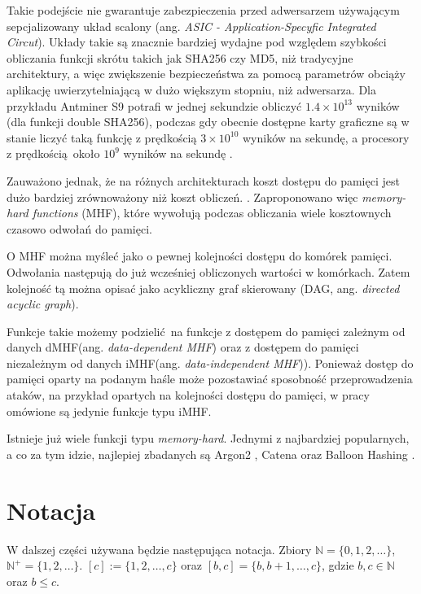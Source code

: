 Takie podejście nie gwarantuje zabezpieczenia przed adwersarzem używającym sepcjalizowany układ scalony (ang. \textit{ASIC - Application-Specyfic Integrated Circut}).
Układy takie są znacznie bardziej wydajne pod względem szybkości obliczania funkcji skrótu takich jak SHA256 czy MD5, niż tradycyjne architektury, a więc zwiększenie bezpieczeństwa za pomocą parametrów obciąży aplikację uwierzytelniającą w dużo większym stopniu, niż adwersarza.
Dla przykładu Antminer S9 \cite{antminer} potrafi w jednej sekundzie obliczyć $1.4\times 10^{13}$ wyników (dla funkcji double SHA256), podczas gdy obecnie dostępne karty graficzne są w stanie liczyć taką funkcję z prędkością $3\times 10^{10}$ wyników na sekundę, a procesory z prędkością około $10^9$ wyników na sekundę \cite{rs}.

Zauważono jednak, że na różnych architekturach koszt dostępu do pamięci jest dużo bardziej zrównoważony niż koszt obliczeń. \cite{percival2009stronger}.
Zaproponowano więc \textit{memory-hard functions} (MHF), które wywołują podczas obliczania wiele kosztownych czasowo odwołań do pamięci.

O MHF można myśleć jako o pewnej kolejności dostępu do komórek pamięci. Odwołania następują do już wcześniej obliczonych wartości w komórkach.
Zatem kolejność tą można opisać jako acykliczny graf skierowany (DAG, ang. \textit{directed acyclic graph}).

Funkcje takie możemy podzielić na funkcje z dostępem do pamięci zależnym od danych dMHF(ang. \textit{data-dependent MHF}) oraz z dostępem do pamięci niezależnym od danych iMHF(ang. \textit{data-independent MHF})). Ponieważ dostęp do pamięci oparty na podanym haśle może pozostawiać sposobność przeprowadzenia ataków, na przykład opartych na kolejności dostępu do pamięci, w pracy omówione są jedynie funkcje typu iMHF.

Istnieje już wiele funkcji typu \textit{memory-hard}. Jednymi z najbardziej popularnych, a co za tym idzie, najlepiej zbadanych są Argon2 \cite{biryukov2016argon2}, Catena \cite{forler2013catena} oraz Balloon Hashing \cite{boneh2016balloon}.

\section{Notacja}

W dalszej części używana będzie następująca notacja.
Zbiory $\mathbb{N} = \{ 0,1,2,\dots \}$, $ \mathbb{N}^{+} = \{ 1, 2, \dots \}$.
$[c] := \{1, 2,\dots,c \}$ oraz $[b, c] = \{ b, b+1, \dots, c \}$, gdzie $b, c \in \mathbb{N}$ oraz $b \leq c$.

